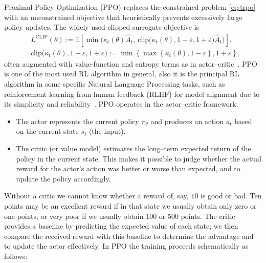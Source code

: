 \documentclass{article}
\numberwithin{equation}{section}
\newcommand{\E}{\mathbb E}
\renewcommand{\epsilon}{\varepsilon}
\begin{document}
Proximal Policy Optimization (PPO) replaces the constrained problem \eqref{eq:trpo} with an unconstrained objective that heuristically prevents excessively large policy updates. The widely used clipped surrogate objective is
\begin{equation}\label{eq:ppo_clip}
    \begin{aligned}
        &L^{\mathrm{CLIP}}(\theta)
        :=
        \E\!\left[\min\!\Big(\kappa_t(\theta)\hat A_t,\ \mathrm{clip}\big(\kappa_t(\theta),1-\epsilon,1+\epsilon\big)\hat A_t\Big)\right],\\
        &\mathrm{clip}\big(\kappa_t(\theta),1-\epsilon,1+\epsilon\big) := \min\left\{\max\left\{\kappa_t(\theta), 1 - \varepsilon\right\}, 1 + \varepsilon\right\},
    \end{aligned}
\end{equation}
often augmented with value-function and entropy terms as in actor--critic~\cite{schulman2017proximal,xu2023alphappo}. PPO is one of the most used RL algorithm in general, also it is the principal RL algorithm in some specific Natural Language Processing tasks, such as reinforcement learning from human feedback (RLHF) for model alignment due to
its simplicity and reliability~\cite{liu2026reinforcement}. PPO operates in the actor--critic framework:
\begin{itemize}
  \item The actor represents the current policy $\pi_\theta$ and produces an action $a_t$ based on the current state $s_t$ (the input).
  \item The critic (or value model) estimates the long--term expected return of the policy in the current state. This makes it possible to judge whether the actual reward for the actor's action was better or worse than expected, and to update the policy accordingly.
\end{itemize}
Without a critic we cannot know whether a reward of, say, $10$ is good or bad. Ten points may be an excellent reward if in that state we usually obtain only zero or one points, or very poor if we usually obtain $100$ or $500$ points. The critic provides a baseline by predicting the expected value of each state; we then compare the received reward with this baseline to determine the advantage and to update the actor effectively. In PPO the training proceeds schematically as follows:
\end{document}

